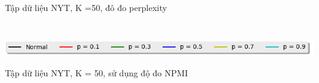 \documentclass[pdf]{beamer}
\begin{document}
\begin{frame}{Tập dữ liệu NYT, K =50, đô đo perplexity}
\begin{columns}[T]
\begin{column}{.50\textwidth}
\begin{figure}
		\end{figure}				
	\end{column} %
\end{columns}
\begin{center}
	\includegraphics[width=1\textwidth]{menu.png}	
\end{center}
\end{frame}

\begin{frame}{Tập dữ liệu NYT, K = 50, sử dụng độ đo NPMI }
\begin{columns}[T] %
\begin{column}{.50\textwidth}
	\begin{figure}
	\end{figure}
\end{column} %
\hfill%
\begin{column}{.50\textwidth}
	\begin{figure}

\end{figure}
\end{column}
\end{columns}
\end{frame}
\end{document}
